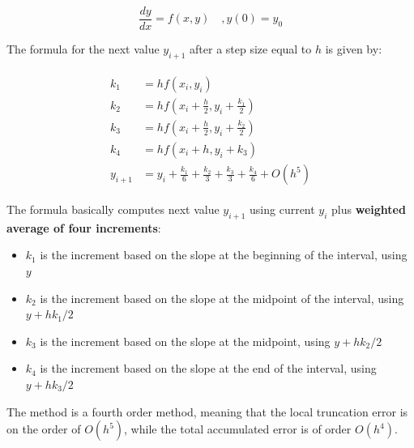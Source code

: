 \documentclass[10pt,b5paper,titlepage]{book}
\newenvironment{ematrix}
{
    \begin{eqnarray}
        \begin{aligned}
}
{
        \end{aligned}
    \end{eqnarray}
}
\begin{document}
\begin{equation}
    \frac{dy}{dx} = f(x,y) \quad , y(0) = y_0
\end{equation}

The formula for the next value $ y_{i+1} $ after a step size equal to $h $ is given by:

\begin{ematrix}
    k_1 &= h f(x_i, y_i)\\
    k_2 &= h f(x_i + \frac{h}{2}, y_i + \frac{k_1}{2})\\
    k_3 &= h f(x_i + \frac{h}{2}, y_i + \frac{k_2}{2})\\
    k_4 &= h f(x_i + h, y_i + k_3)\\
    y_{i+1} &= y_i + \frac{k_1}{6} + \frac{k_2}{3} + \frac{k_3}{3} + \frac{k_4}{6} + O(h^5)
\end{ematrix}

The formula basically computes next value $ y_{i+1} $ using current $ y_i $ plus
\textbf{weighted average of four increments}:

\begin{itemize}
    \item $ k_1 $ is the increment based on the slope at the beginning of the
    interval, using $ y $

    \item $ k_2 $ is the increment based on the slope at the midpoint of the interval,
        using $ y + h k_1 / 2 $

    \item $ k_3 $ is the increment based on the slope at the midpoint,
        using $ y + h k_2 / 2 $

    \item $ k_4 $ is the increment based on the slope at the end of the interval,
        using $ y + h k_3 / 2 $

\end{itemize}

The method is a fourth order method, meaning that the local truncation error is
on the order of $ O(h^5) $, while the total accumulated error is of order $ O(h^4) $.
\end{document}
